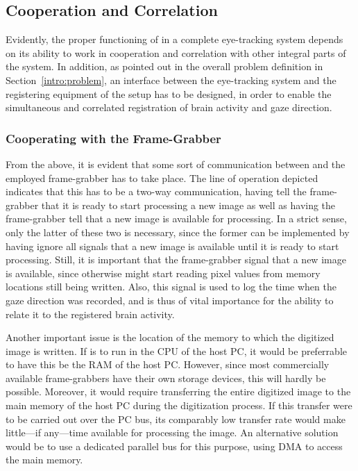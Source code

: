\subsection{Cooperation and Correlation}
\label{algo:future:cooperate}

Evidently, the proper functioning of {\octopus} in a complete
eye-tracking system depends on its ability to work in cooperation and
correlation with other integral parts of the system.  In addition, as
pointed out in the overall problem definition in
Section~\ref{intro:problem}, an interface between the eye-tracking
system and the registering equipment of the setup has to be designed,
in order to enable the simultaneous and correlated registration of
brain activity and gaze direction.

\subsubsection{Cooperating with the Frame-Grabber}

From the above, it is evident that some sort of communication between
{\octopus} and the employed frame-grabber has to take place.  The line
of operation depicted indicates that this has to be a two-way
communication, having {\octopus} tell the frame-grabber that it is
ready to start processing a new image as well as having the
frame-grabber tell {\octopus} that a new image is available for
processing.  In a strict sense, only the latter of these two is
necessary, since the former can be implemented by having {\octopus}
ignore all signals that a new image is available until it is ready to
start processing.  Still, it is important that the frame-grabber
signal that a new image is available, since otherwise {\octopus} might
start reading pixel values from memory locations still being written.
Also, this signal is used to log the time when the gaze direction was
recorded, and is thus of vital importance for the ability to relate it
to the registered brain activity.

Another important issue is the location of the memory to which the
digitized image is written.  If {\octopus} is to run in the CPU of the
host PC, it would be preferrable to have this be the RAM of the host
PC.  However, since most commercially available frame-grabbers have
their own storage devices, this will hardly be possible.  Moreover, it
would require transferring the entire digitized image to the main
memory of the host PC during the digitization process.  If this
transfer were to be carried out over the PC bus, its comparably low
transfer rate would make little---if any---time available for
processing the image.  An alternative solution would be to use a
dedicated parallel bus for this purpose, using DMA to access the main
memory.  

